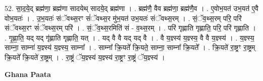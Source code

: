 \documentclass[17pt]{extarticle}
\begin{document}
52. सा॒द॒ये॒द् ब्रह्म॑णा॒ ब्रह्म॑णा सादयेथ् सादये॒द् ब्रह्म॑णा । . ब्रह्म॑णै॒ वैव ब्रह्म॑णा॒ ब्रह्म॑णै॒व । . ए॒वोभ॒यत॑ उभ॒यत॑ ए॒वै वोभ॒यतः॑ । . उ॒भ॒यतः॑ संॅवथ्स॒रꣳ सं॑ॅवथ्स॒र मु॑भ॒यत॑ उभ॒यतः॑ संॅवथ्स॒रम् । . सं॒ॅव॒थ्स॒रम् परि॒ परि॑ संॅवथ्स॒रꣳ सं॑ॅवथ्स॒रम् परि॑ । . सं॒ॅव॒थ्स॒रमिति॑ सं - व॒थ्स॒रम् । . परि॑ गृह्णाति गृह्णाति॒ परि॒ परि॑ गृह्णाति । . गृ॒ह्णा॒ति॒ यद् यद् गृ॑ह्णाति गृह्णाति॒ यत् । . यद् वै वै यद् यद् वै । . वै य॒ज्ञ्स्य॑ य॒ज्ञ्स्य॒ वै वै य॒ज्ञ्स्य॑ । . य॒ज्ञ्स्य॒ साम्ना॒ साम्ना॑ य॒ज्ञ्स्य॑ य॒ज्ञ्स्य॒ साम्ना᳚ । . साम्ना᳚ क्रि॒यते᳚ क्रि॒यते॒ साम्ना॒ साम्ना᳚ क्रि॒यते᳚ । . क्रि॒यते॑ रा॒ष्ट्रꣳ रा॒ष्ट्रम् क्रि॒यते᳚ क्रि॒यते॑ रा॒ष्ट्रम् । . रा॒ष्ट्रं ॅय॒ज्ञ्स्य॑ य॒ज्ञ्स्य॑ रा॒ष्ट्रꣳ रा॒ष्ट्रं ॅय॒ज्ञ्स्य॑ । \newline

\textbf{Ghana Paata } \newline
\end{document}
